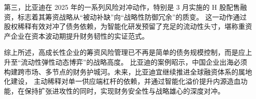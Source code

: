 \documentclass[12pt,a4paper,fontset=windows,UTF8]{ctexart}
\begin{document}
第三，比亚迪在 2025 年的一系列风险对冲动作，特别是 3 月实施的 H 股配售融资，标志着其筹资战略从“被动补缺”向“战略性防御冗余”的质变。
  这一动作通过股权稀释有效对冲了债务依赖，为智能化研发预留了充足的流动性头寸，堪称重资产企业在资本波动期提升财务韧性的实证范式。

综上所述，高成长性企业的筹资风险管理已不再是简单的债务规模控制，而是应上升至“流动性弹性动态博弈”的战略高度。
  比亚迪的案例昭示，中国企业出海必须构建跨市场、多节点的财务护城河。未来，比亚迪宜继续推进全球融资体系的属地化建设，
  主动稀释对单一供应端杠杆的依赖，并通过智能化溢价提升内源造血功能，在保持扩张进攻性的同时，实现财务安全性与战略雄心的深度对冲。

\vspace*{3\baselineskip}
\end{document}
